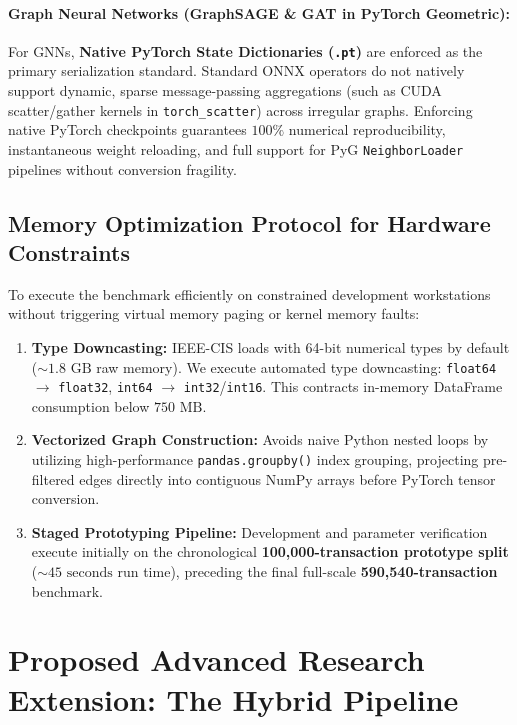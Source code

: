 \documentclass[11pt,a4paper]{article}
\begin{document}
\paragraph{Graph Neural Networks (GraphSAGE \& GAT in PyTorch Geometric):}
For GNNs, \textbf{Native PyTorch State Dictionaries (\texttt{.pt})} are enforced as the primary serialization standard. Standard ONNX operators do not natively support dynamic, sparse message-passing aggregations (such as CUDA scatter/gather kernels in \texttt{torch\_scatter}) across irregular graphs. Enforcing native PyTorch checkpoints guarantees $100\%$ numerical reproducibility, instantaneous weight reloading, and full support for PyG \texttt{NeighborLoader} pipelines without conversion fragility.

\subsection{Memory Optimization Protocol for Hardware Constraints}
To execute the benchmark efficiently on constrained development workstations without triggering virtual memory paging or kernel memory faults:
\begin{enumerate}[leftmargin=*]
    \item \textbf{Type Downcasting:} IEEE-CIS loads with 64-bit numerical types by default ($\sim 1.8\text{ GB}$ raw memory). We execute automated type downcasting: \texttt{float64} $\to$ \texttt{float32}, \texttt{int64} $\to$ \texttt{int32}/\texttt{int16}. This contracts in-memory DataFrame consumption below $750\text{ MB}$.
    \item \textbf{Vectorized Graph Construction:} Avoids naive Python nested loops by utilizing high-performance \texttt{pandas.groupby()} index grouping, projecting pre-filtered edges directly into contiguous NumPy arrays before PyTorch tensor conversion.
    \item \textbf{Staged Prototyping Pipeline:} Development and parameter verification execute initially on the chronological \textbf{100,000-transaction prototype split} ($\sim 45\text{ seconds}$ run time), preceding the final full-scale \textbf{590,540-transaction} benchmark.
\end{enumerate}

\section{Proposed Advanced Research Extension: The Hybrid Pipeline}
\end{document}
